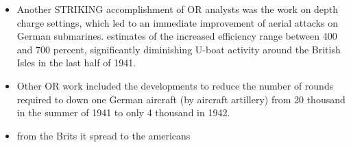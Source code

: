 \documentclass{article}
\begin{document}
\begin{itemize}
\item Another STRIKING accomplishment of OR analysts was the work on depth charge settings, which led to an immediate improvement of aerial attacks on German submarines. estimates of the increased efficiency range between 400 and 700 percent, significantly diminishing U-boat activity around the British Isles in the last half of 1941.
\item Other OR work included the developments to reduce the number of rounds required to down one German aircraft (by aircraft artillery) from 20 thousand in the summer of 1941 to only 4 thousand in 1942.
\item from the Brits it spread to the americans 
\end{itemize}
\end{document}
